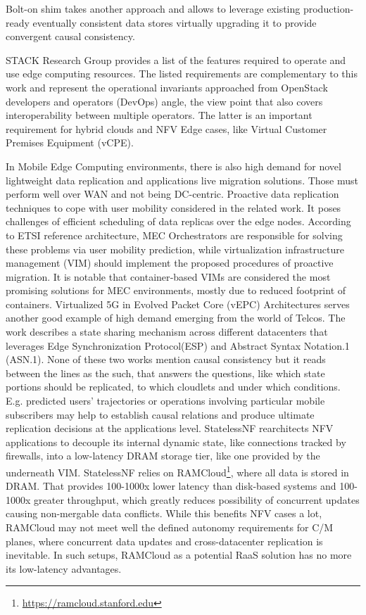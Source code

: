 \documentclass[conference]{IEEEtran}
\begin{document}
Bolt-on\cite{b13} shim takes another approach and allows to leverage existing
production-ready eventually consistent data stores virtually upgrading it to
provide convergent causal consistency.

STACK Research Group\cite{b8} provides a list of the features required to
operate and use edge computing resources. The listed requirements are
complementary to this work and represent the operational invariants approached
from OpenStack developers and operators (DevOps) angle, the view point that
also covers interoperability between multiple operators. The latter is an
important requirement for hybrid clouds and NFV Edge cases, like Virtual
Customer Premises Equipment (vCPE).

In Mobile Edge Computing environments, there is also high demand for novel
lightweight data replication and applications live migration solutions. Those
must perform well over WAN and not being DC-centric. Proactive data replication
techniques to cope with user mobility considered in the related work\cite{b14}.
It poses challenges of efficient scheduling of data replicas over the edge
nodes. According to ETSI reference architecture, MEC Orchestrators are
responsible for solving these problems via user mobility prediction, while
virtualization infrastructure management (VIM) should implement the proposed
procedures of proactive migration. It is notable that container‐based VIMs are
considered the most promising solutions for MEC environments, mostly due to
reduced footprint of containers. Virtualized 5G in Evolved Packet Core (vEPC)
Architectures\cite{b15} serves another good example of high demand emerging
from the world of Telcos. The work describes a state sharing mechanism across
different datacenters that leverages Edge Synchronization Protocol(ESP) and
Abstract Syntax Notation.1 (ASN.1). None of these two works mention
causal consistency but it reads between the lines as the such, that answers the
questions, like which state portions should be replicated, to which cloudlets
and under which conditions. E.g. predicted users' trajectories or operations
involving particular mobile subscribers may help to establish causal relations
and produce ultimate replication decisions at the applications level.
StatelessNF\cite{b16} rearchitects NFV applications to decouple its internal
dynamic state, like connections tracked by firewalls, into a low-latency DRAM
storage tier, like one provided by the underneath VIM. StatelessNF relies on
RAMCloud\footnote{\url{https://ramcloud.stanford.edu}}, where all data is
stored in DRAM. That provides 100-1000x lower latency than disk-based systems
and 100-1000x greater throughput, which greatly reduces possibility of
concurrent updates causing non-mergable data conflicts. While this benefits NFV
cases a lot, RAMCloud may not meet well the defined autonomy requirements for
C/M planes, where concurrent data updates and cross-datacenter
replication is inevitable. In such setups, RAMCloud as a potential RaaS
solution has no more its low-latency advantages.
\end{document}
